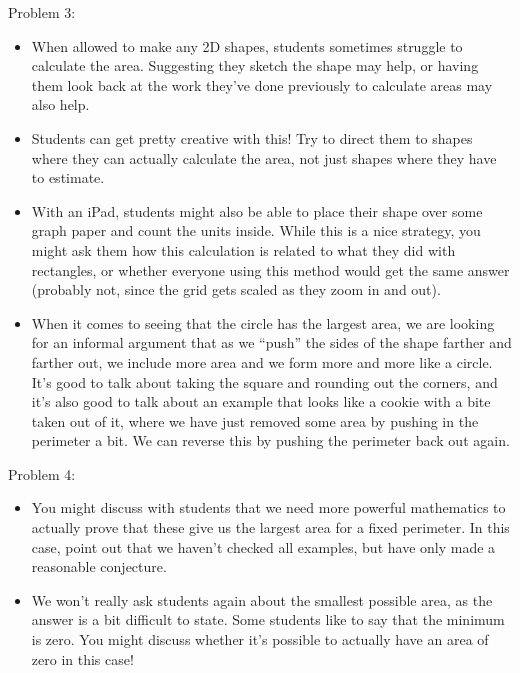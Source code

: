 \documentclass[noauthor,nooutcomes, handout]{ximera}
\begin{document}
\begin{instructorNotes}
\begin{itemize}
\begin{enumerate}
\end{enumerate}
\end{itemize}

Problem 3:

\begin{itemize}
\item   When allowed to make any 2D shapes, students sometimes struggle to calculate the area.  Suggesting they sketch the shape may help, or having them look back at the work they've done previously to calculate areas may also help.  

\item Students can get pretty creative with this!  Try to direct them to shapes where they can actually calculate the area, not just shapes where they have to estimate.

\item With an iPad, students might also be able to place their shape over some graph paper and count the units inside. While this is a nice strategy, you might ask them how this calculation is related to what they did with rectangles, or whether everyone using this method would get the same answer (probably not, since the grid gets scaled as they zoom in and out).

\item When it comes to seeing that the circle has the largest area, we are looking for an informal argument that as we ``push'' the sides of the shape farther and farther out, we include more area and we form more and more like a circle.  It's good to talk about taking the square and rounding out the corners, and it's also good to talk about an example that looks like a cookie with a bite taken out of it, where we have just removed some area by pushing in the perimeter a bit. We can reverse this by pushing the perimeter back out again.
\end{itemize}

Problem 4:
\begin{itemize}
	\item You might discuss with students that we need more powerful mathematics to actually prove that these give us the largest area for a fixed perimeter.  In this case, point out that we haven't checked all examples, but have only made a reasonable conjecture.
	\item We won't really ask students again about the smallest possible area, as the answer is a bit difficult to state.  Some students like to say that the minimum is zero.  You might discuss whether it's possible to actually have an area of zero in this case!
\end{itemize}


\end{instructorNotes}
\end{document}
